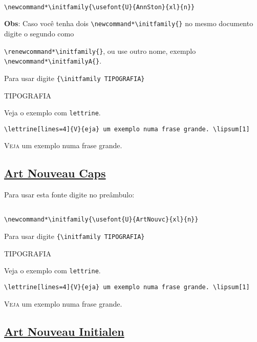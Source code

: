 \documentclass[a4paper]{article}
\newcommand{\tipo}{TIPOGRAFIA}
\begin{document}
\begin{verbatim}

\newcommand*\initfamily{\usefont{U}{AnnSton}{xl}{n}}
\end{verbatim}

\textbf{Obs}: Caso você tenha dois \verb|\newcommand*\initfamily{}| no mesmo documento digite o segundo como

\verb|\renewcommand*\initfamily{}|, ou use outro nome, exemplo \verb|\newcommand*\initfamilyA{}|.

Para usar digite \verb|{\initfamily TIPOGRAFIA}|

{\initfamily\Huge \tipo}

Veja o exemplo com \texttt{lettrine}.

\begin{verbatim}
\lettrine[lines=4]{V}{eja} um exemplo numa frase grande. \lipsum[1]
\end{verbatim}

\lettrine[lines=4]{V}{eja} um exemplo numa frase grande. \lipsum[1]


\subsection*{\href{http://www.tug.dk/FontCatalogue/artnouvc/}{Art Nouveau Caps}}

Para usar esta fonte digite no preâmbulo:


\renewcommand*\initfamily{\usefont{U}{ArtNouvc}{xl}{n}}

\begin{verbatim}

\newcommand*\initfamily{\usefont{U}{ArtNouvc}{xl}{n}}
\end{verbatim}

Para usar digite \verb|{\initfamily TIPOGRAFIA}|

{\initfamily\Huge \tipo}

Veja o exemplo com \texttt{lettrine}.

\begin{verbatim}
\lettrine[lines=4]{V}{eja} um exemplo numa frase grande. \lipsum[1]
\end{verbatim}

\lettrine[lines=4]{V}{eja} um exemplo numa frase grande. \lipsum[1]

\newpage 

\subsection*{\href{http://www.tug.dk/FontCatalogue/artnouv/}{Art Nouveau Initialen}}
\end{document}
